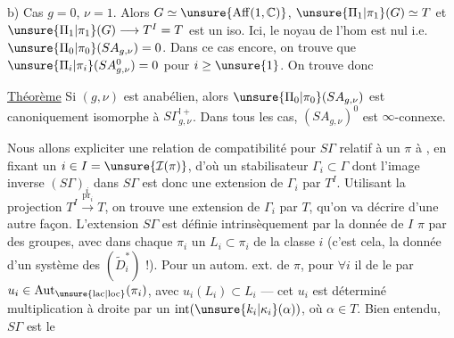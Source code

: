 b) Cas $g=0$, $\nu=1$. Alors $G\simeq\unsure{\operatorname{Aff}(1,\mathbb C)}$,
$\unsure{\Pi_1|\pi_1}(G)\simeq T$ et
$\unsure{\Pi_1|\pi_1}(G)\longrightarrow T^I=T$ est un iso.
Ici,  le noyau de l'hom
est nul
i.e.  $\unsure{\Pi_0|\pi_0}(SA_{g,\nu})=0$.
Dans ce cas encore, on trouve que $\unsure{\Pi_i|\pi_i}(SA_{g,\nu}^0)=0$
pour  $i\geq\unsure{1}$. On trouve donc

\uline{Théorème} 
Si $(g,\nu)$ est anabélien, alors $\unsure{\Pi_0|\pi_0}(SA_{g,\nu})$ est canoniquement isomorphe à $S\Gamma_{g,\nu}^{!+}$.
Dans tous les cas, $(SA_{g,\nu})^0$ est $\infty$-connexe.


Nous allons expliciter une relation de
compatibilité pour $S\Gamma$ relatif à un $\pi$
à , en fixant un $i\in I=\unsure{\mathcal I(\pi)}$,
d'où un stabilisateur $\Gamma_i\subset\Gamma$ dont l'image
inverse $(S\Gamma)_i$ dans $S\Gamma$ est donc une
extension de $\Gamma_i$ par $T^I$. Utilisant la
projection $T^I\xrightarrow{\mathrm{pr}_i}T$, on trouve une
extension de $\Gamma_i$ par $T$, qu'on va décrire
d'une autre façon. L'extension $S\Gamma$
est définie intrinsèquement par la
donnée de $I$   
 $\pi$ par des groupes, avec dans
chaque $\pi_i$ un $L_i\subset\pi_i$ de la classe $i$
(c'est cela, la donnée d'un système des
$(\widetilde D_i^*)$ !). Pour un autom. ext.   de $\pi$,
pour $\forall i$ il   de le
 par $u_i\in\operatorname{Aut}_{\unsure{\mathrm{lac}|\mathrm{loc}}}(\pi_i)$, avec $u_i(L_i)\subset L_i$
--- cet $u_i$ est déterminé  multiplication
à droite par un $\operatorname{int}(\unsure{k_i|\kappa_i}(\alpha))$, où $\alpha\in T$.
Bien entendu, $S\Gamma$ est le  


